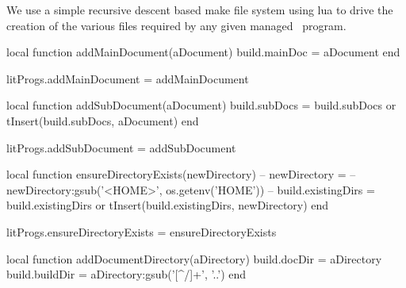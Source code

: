 
\startchapter[title=Lua Make System Files]

We use a simple recursive descent based make file system using lua to 
drive the creation of the various files required by any given 
 managed \ConTeXt\ program. 

\startMkIVCode
\def\addMainDocument#1{
  \directlua{
    thirddata.literateProgs.addMainDocument('#1')
  }
}

\def\addSubDocument#1{
  \directlua{
    thirddata.literateProgs.addSubDocument('#1')
  }
}

\def\ensureDirectoryExists#1{
  \directlua{
    thirddata.literateProgs.ensureDirectoryExists('#1')
  }
}

\def\addDocumentDirectory#1{
  \directlua{
    thirddata.literateProgs.addDocumentDirectory('#1')
  }
}

\def\addConTeXtModuleDirectory#1{
  \directlua{
    thirddata.literateProgs.addConTeXtModuleDirectory('#1')
  }
}

\def\addCCodeProgram#1{
  \directlua{
    thirddata.literateProgs.addCCodeProgram('#1')
  }
}

\def\addCCodeLibDirectory#1{
  \directlua{
    thirddata.literateProgs.addCCodeLibDirectory('#1')
  }
}

\def\addCCodeLib#1{
  \directlua{
    thirddata.literateProgs.addCCodeLib('#1')
  }
}

\def\addCCodeTargets#1{
  \directlua{
    thirddata.literateProgs.addCCodeTargets('#1')
  }
}
\stopMkIVCode

\startLuaCode
local function addMainDocument(aDocument)
  build.mainDoc = aDocument
end

litProgs.addMainDocument = addMainDocument

local function addSubDocument(aDocument)
  build.subDocs = build.subDocs or { }
  tInsert(build.subDocs, aDocument)
end

litProgs.addSubDocument = addSubDocument

local function ensureDirectoryExists(newDirectory)
--  newDirectory =
--    newDirectory:gsub('<HOME>', os.getenv('HOME'))
--  build.existingDirs = build.existingDirs or { }
  tInsert(build.existingDirs, newDirectory)
end

litProgs.ensureDirectoryExists = ensureDirectoryExists

local function addDocumentDirectory(aDirectory)
  build.docDir   = aDirectory
  build.buildDir = aDirectory:gsub('[^/]+', '..')
end

